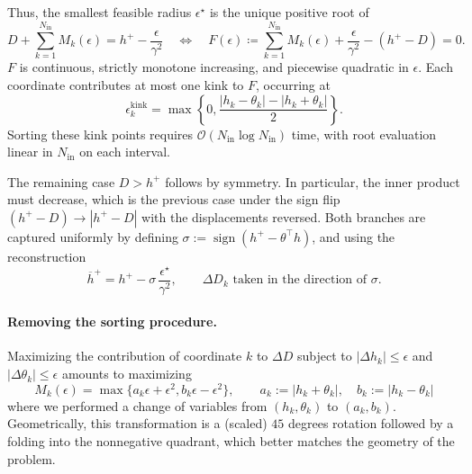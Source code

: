 Thus, the smallest feasible radius $\epsilon^\star$ is the unique positive root of
\[
    D+\sum_{k=1}^{N_{\mathrm{in}}} M_k(\epsilon)
      = h^{+} - \frac{\epsilon}{\gamma^2}
    \quad\iff\quad
    F(\epsilon)
      \coloneqq \sum_{k=1}^{N_{\mathrm{in}}} M_k(\epsilon) + \frac{\epsilon}{\gamma^2} - (h^{+} - D)
      = 0.
\]
$F$ is continuous, strictly monotone increasing, and piecewise quadratic in
$\epsilon$. Each coordinate contributes at most one kink to $F$, occurring at
\[
  \epsilon_k^{\mathrm{kink}}
    = \max\left\{0,
      \frac{|h_k-\theta_{k}|-|h_k+\theta_{k}|}{2}
    \right\}.
\]
Sorting these kink points requires $\mathcal{O}(N_{\mathrm{in}}\log N_{\mathrm{in}})$
time, with root evaluation linear in $N_{\mathrm{in}}$ on each interval.

The remaining case $D > h^+$ follows by symmetry. In particular, the inner product must decrease, which is the previous
case under the sign flip $(h^+ - D) \to |h^+ - D|$ with the displacements
reversed. Both branches are captured uniformly by defining
$\sigma := \operatorname{sign}(h^+ - \theta^\top h)$, and using the reconstruction
\[
\overline{h}^{+}=h^{+}-\sigma\,\frac{\epsilon^\star}{\gamma^2},
\qquad \Delta D_k \text{ taken in the direction of } \sigma.
\]

\paragraph{Removing the sorting procedure.}
Maximizing the contribution of coordinate $k$ to $\Delta D$ subject to
$|\Delta h_k|\le\epsilon$ and $|\Delta\theta_k|\le\epsilon$ amounts to maximizing 
\begin{equation}
\label{eq:bilinf-Mk-branches}
  M_k(\epsilon)
    = \max\bigl\{a_k\epsilon + \epsilon^2, b_k\epsilon - \epsilon^2\bigr\},
  \qquad a_k := |h_k+\theta_k|,\quad b_k := |h_k-\theta_k|
\end{equation}
where we performed a change of variables from $(h_k,\theta_k)$ to $(a_k,b_k)$. Geometrically, this transformation is a (scaled) $45$ degrees rotation followed by a folding into the nonnegative quadrant, which better matches the geometry of the problem.

